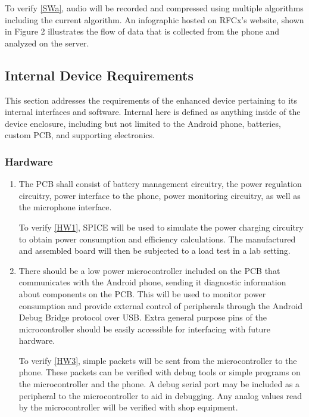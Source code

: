 \documentclass{article}
\numberwithin{figure}{section}
\numberwithin{equation}{section}
\begin{document}
{\begin{enumerate}[align=left,leftmargin=*, labelindent= 0em, label=\textbf{Requirement \thesubsubsection.\arabic*.}, itemindent=0em]
\baselinestretch
To verify \ref{SWa}, audio will be recorded and compressed using multiple algorithms including the current algorithm. An infographic hosted on RFCx’s website, shown in Figure 2 illustrates the flow of data that is collected from the phone and analyzed on the server.
\end{enumerate}

\subsection{Internal Device Requirements} \label{sect:internaldev}
This section addresses the requirements of the enhanced device pertaining to its internal interfaces and software. Internal here is defined as anything inside of the device enclosure, including but not limited to the Android phone, batteries, custom PCB, and supporting electronics.

\subsubsection{Hardware} \label{sect:hardware2}
\begin{enumerate}[align=left,leftmargin=*, labelindent= 0em, label=\textbf{Requirement \thesubsubsection.\arabic*.}, itemindent=0em]
\item \label{HW1}The PCB shall consist of battery management circuitry, the power regulation circuitry, power interface to the phone, power monitoring circuitry, as well as the microphone interface.

\baselinestretch
To verify \ref{HW1}, SPICE will be used to simulate the power charging circuitry to obtain power consumption and efficiency calculations. The manufactured and assembled board will then be subjected to a load test in a lab setting.

\item \label{HW3}There should be a low power microcontroller included on the PCB that communicates with the Android phone, sending it diagnostic information about components on the PCB. This will be used to monitor power consumption and provide external control of peripherals through the Android Debug Bridge protocol over USB. Extra general purpose pins of the microcontroller should be easily accessible for interfacing with future hardware.

\baselinestretch
To verify \ref{HW3}, simple packets will be sent from the microcontroller to the phone. These packets can be verified with debug tools or simple programs on the microcontroller and the phone. A debug serial port may be included as a peripheral to the microcontroller to aid in debugging. Any analog values read by the microcontroller will be verified with shop equipment.


\end{enumerate}}
\end{document}
